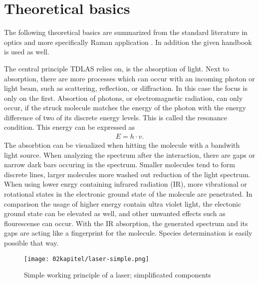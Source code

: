 
\chapter{Theoretical basics}
\label{chap:theoretical}

The following theoretical basics are summarized from the standard literature in optics \autocite{bornPrinciplesOpticsElectromagnetic1999,hechtOptik2005,lipsonOptik1997,niedrigOptikWellenUnd2004} and more specifically Raman application \autocite{herzbergMolecularSpectraMolecular2013,schraderInfraredRamanSpectroscopy1995}. In addition the given handbook \autocite{klevanskyTDLASTunableLaser2021} is used as well.

The central principle TDLAS relies on, is the absorption of light. Next to absorption, there are more processes which can occur with an incoming photon or light beam, such as scattering, reflection, or diffraction. In this case the focus is only on the first. Absortion of photons, or electromagnetic radiation, can only occur, if the struck molecule matches the energy of the photon with the energy difference of two of its discrete energy levels. This is called the resonance condition. This energy can be expressed as
\begin{align}
    E=h \cdot v \nonumber .
\end{align}
The absorbtion can be visualized when hitting the molecule with a bandwith light source. When analyzing the spectrum after the interaction, there are gaps or narrow dark bars occuring in the spectrum. Smaller molecules tend to form discrete lines, larger molecules more washed out reduction of the light spectrum. When using lower enrgy containing infrared radiation (IR), more vibrational or rotational states in the electronic ground state of the molecule are penetrated. In comparison the usage of higher energy contain ultra violet light, the electonic ground state can be elevated as well, and other unwanted effects such as flourescense can occur. With the IR absorption, the generated spectrum and its gaps are acting like a fingerprint for the molecule. Species determination is easily possible that way.


\begin{figure}[!htb]
    \centering
    \texttt{[image: 02kapitel/laser-simple.png]}
    \caption[Components and working pronciples of a laser]{Simple working principle of a laser; simplificated components \autocite{klevanskyTDLASTunableLaser2021}}
    \label{fig:laser-simple}
\end{figure}

